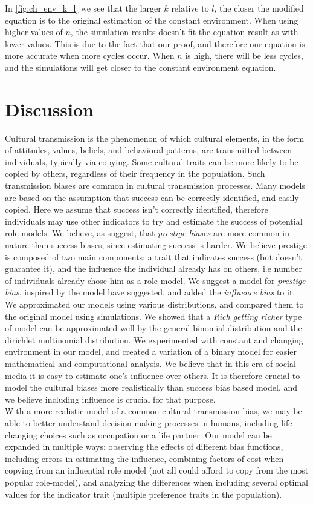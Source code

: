 \documentclass[11pt]{article}
\begin{document}
In \cref{fig:ch_env_k_l} we see that the larger $k$ relative to $l$, the closer the modified equation is to the original estimation of the constant environment. 
When using higher values of $n$, the simulation results doesn't fit the equation result as with lower values. This is due to the fact that our proof, and therefore our equation is more accurate when more cycles occur. When $n$ is high, there will be less cycles, and the simulations will get closer to the constant environment equation.

\section{Discussion}
Cultural transmission is the phenomenon of which cultural elements, in the form of attitudes, values, beliefs, and behavioral patterns, are transmitted between individuals, typically via copying.
Some cultural traits can be more likely to be copied by others, regardless of their frequency in the population.  
Such transmission biases are common in cultural transmission processes. 
Many models are based on the assumption that success can be correctly identified, and easily copied.
Here we assume that success isn't correctly identified, therefore individuals may use other indicators to try and estimate the success of potential role-models.
We believe, as \citet{complexityPaper} suggest, that \textit{prestige biases} are more common in nature than success biases, since estimating success is harder.
We believe prestige is composed of two main components: a trait that indicates success (but doesn't guarantee it), and the influence the individual already has on others, i.e number of individuals already chose him as a role-model.
We suggest a model for \textit{prestige bias}, inspired by the model \citet{evolutionBook} have suggested, and added the \textit{influence bias} to it.
We approximated our models using various distributions, and compared them to the original model using simulations.
We showed that a \textit{Rich getting richer} type of model can be approximated well by the general binomial distribution and the dirichlet multinomial distribution.
We experimented with constant and changing environment in our model, and created a variation of a binary model for easier mathematical and computational analysis.
We believe that in this era of social media it is easy to estimate one's influence over others.
It is therefore crucial to model the cultural biases more realistically than success bias based model, and we believe including influence is crucial for that purpose.\\
With a more realistic model of a common cultural transmission bias, we may be able to better understand decision-making processes in humans, including life-changing choices such as occupation or a life partner. 
Our model can be expanded in multiple ways: observing the effects of different bias functions, including errors in estimating the influence, combining factors of cost when copying from an influential role model (not all could afford to copy from the most popular role-model), and analyzing the differences when including several optimal values for the indicator trait (multiple preference traits in the population).
\end{document}
